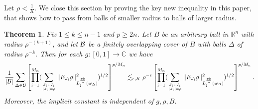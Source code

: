 \documentclass[amssymb,amsfonts,12pt]{amsart}
\newtheorem{theorem}{Theorem}[section]
\def\R{{\mathbb R}}
\def\C{{\mathbb C}}
\begin{document}
\bigskip

Let  $\rho<\frac1K$. We close this section by proving the key new inequality in this paper, that shows how to pass from balls of smaller radius to balls of larger radius.
\begin{theorem}
\label{nt4}
Fix $1\le k\le n-1$ and $p\ge 2n$.
Let $B$ be an arbitrary ball in $\R^n$ with radius $\rho^{-(k+1)}$, and let ${\mathcal B}$ be a finitely overlapping cover of $B$ with balls $\Delta$ of radius $\rho^{-k}$. Then for each $g:[0,1]\to \C$ we have
$$\frac1{|{\mathcal B}|}\sum_{\Delta\in{\mathcal B}}\left[\prod_{i=1}^{M_n}(\sum_{J_i\subset I_i\atop{|J_i|=\rho}}\|E_{J_i}g\|_{L_{\sharp}^{\frac{pk}{n}}(w_\Delta)}^2)^{1/2}\right]^{p/{M_n}}\lesssim_{\epsilon,K}\rho^{-\epsilon} \left[\prod_{i=1}^{M_n}(\sum_{J_i\subset I_i\atop{|J_i|=\rho}}\|E_{J_i}g\|_{L_{\sharp}^{\frac{pk}{n}}(w_B)}^2)^{1/2}\right]^{p/M_n}.$$
Moreover, the implicit constant is independent of $g,\rho,B$.
\end{theorem}
\end{document}
